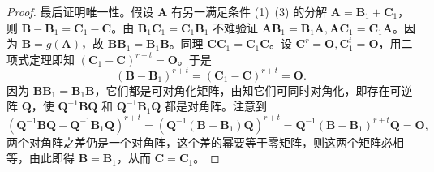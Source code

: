 \documentclass[../../main.tex]{subfiles}
\begin{document}
\begin{proof}
最后证明唯一性。假设 $\boldsymbol{A}$ 有另一满足条件 (1)~(3) 的分解 $\boldsymbol{A} = \boldsymbol{B}_1 + \boldsymbol{C}_1$，则 $\boldsymbol{B} - \boldsymbol{B}_1 = \boldsymbol{C}_1 - \boldsymbol{C}$。由 $\boldsymbol{B}_1\boldsymbol{C}_1 = \boldsymbol{C}_1\boldsymbol{B}_1$ 不难验证 $\boldsymbol{AB}_1 = \boldsymbol{B}_1\boldsymbol{A}, \boldsymbol{AC}_1 = \boldsymbol{C}_1\boldsymbol{A}$。因为 $\boldsymbol{B} = g(\boldsymbol{A})$，故 $\boldsymbol{BB}_1 = \boldsymbol{B}_1\boldsymbol{B}$。同理 $\boldsymbol{CC}_1 = \boldsymbol{C}_1\boldsymbol{C}$。设 $\boldsymbol{C}^r = \boldsymbol{O}, \boldsymbol{C}_1^t = \boldsymbol{O}$，用二项式定理即知 $(\boldsymbol{C}_1 - \boldsymbol{C})^{r + t} = \boldsymbol{O}$。于是
\[
(\boldsymbol{B} - \boldsymbol{B}_1)^{r + t} = (\boldsymbol{C}_1 - \boldsymbol{C})^{r + t} = \boldsymbol{O}.
\]
因为 $\boldsymbol{BB}_1 = \boldsymbol{B}_1\boldsymbol{B}$，它们都是可对角化矩阵，由知它们可同时对角化，即存在可逆阵 $\boldsymbol{Q}$，使 $\boldsymbol{Q}^{-1}\boldsymbol{BQ}$ 和 $\boldsymbol{Q}^{-1}\boldsymbol{B}_1\boldsymbol{Q}$ 都是对角阵。注意到
\[
(\boldsymbol{Q}^{-1}\boldsymbol{BQ} - \boldsymbol{Q}^{-1}\boldsymbol{B}_1\boldsymbol{Q})^{r + t} = \left(\boldsymbol{Q}^{-1}(\boldsymbol{B} - \boldsymbol{B}_1)\boldsymbol{Q}\right)^{r + t} = \boldsymbol{Q}^{-1}(\boldsymbol{B} - \boldsymbol{B}_1)^{r + t}\boldsymbol{Q} = \boldsymbol{O},
\]
两个对角阵之差仍是一个对角阵，这个差的幂要等于零矩阵，则这两个矩阵必相等，由此即得 $\boldsymbol{B} = \boldsymbol{B}_1$，从而 $\boldsymbol{C} = \boldsymbol{C}_1$。
\end{proof}
\end{document}
